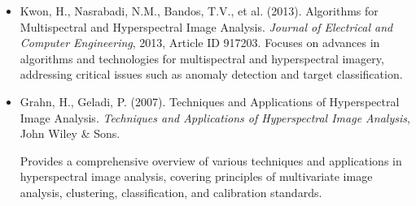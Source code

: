 \documentclass[10pt,svgnames,fragile]{beamer}
\begin{document}
\begin{frame}
\tiny
\begin{itemize}

    \item Kwon, H., Nasrabadi, N.M., Bandos, T.V., et al. (2013). Algorithms for Multispectral and Hyperspectral Image Analysis. \textit{Journal of Electrical and Computer Engineering}, 2013, Article ID 917203. \href{https://www.hindawi.com/journals/jece/2013/917203/}{\color{blue}{DOI: 10.1155/2013/917203}}
    {\color{gray}Focuses on advances in algorithms and technologies for multispectral and hyperspectral imagery, addressing critical issues such as anomaly detection and target classification.}
    
    \item Grahn, H., Geladi, P. (2007). Techniques and Applications of Hyperspectral Image Analysis. \textit{Techniques and Applications of Hyperspectral Image Analysis}, John Wiley \& Sons. \href{https://books.google.com/books?id=2ifVDwAAQBAJ}{\color{blue}{DOI: 10.1002/9780470010861}}

    {\color{gray}Provides a comprehensive overview of various techniques and applications in hyperspectral image analysis, covering principles of multivariate image analysis, clustering, classification, and calibration standards.}
\end{itemize}
\end{frame}
\end{document}
